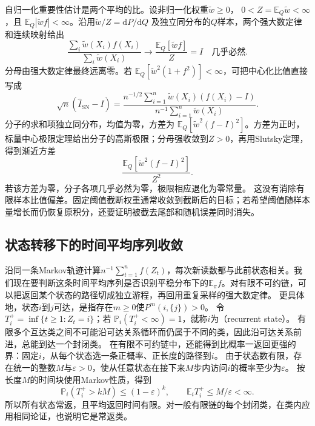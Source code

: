 自归一化重要性估计是两个平均的比。设非归一化权重\(\widetilde w\geq0\)，
\(0<Z=\mathbb E_Q\widetilde w<\infty\)，且
\(\mathbb E_Q|\widetilde wf|<\infty\)。沿用\(\widetilde w/Z=\mathrm dP/\mathrm dQ\)
及独立同分布的\(Q\)样本，两个强大数定律和连续映射给出
\[
\frac{\sum_i\widetilde w(X_i)f(X_i)}
{\sum_i\widetilde w(X_i)}
\longrightarrow
\frac{\mathbb E_Q[\widetilde wf]}Z=I
\quad\text{几乎必然}.
\]
分母由强大数定律最终远离零。若
\(\mathbb E_Q[\widetilde w^2(1+f^2)]<\infty\)，可把中心化比值直接写成
\[
 \sqrt n(\widehat I_{\mathrm{SN}}-I)
 =\frac{n^{-1/2}\sum_{i=1}^n
       \widetilde w(X_i)(f(X_i)-I)}
       {n^{-1}\sum_{i=1}^n\widetilde w(X_i)}.
\]
分子的求和项独立同分布，均值为零，方差为
\(\mathbb E_Q[\widetilde w^2(f-I)^2]\)。方差为正时，标量中心极限定理给出分子的高斯极限；分母强收敛到\(Z>0\)，再用Slutsky定理，得到渐近方差
\[
\frac{\mathbb E_Q[\widetilde w^2(f-I)^2]}{Z^2}.
\]
若该方差为零，分子各项几乎必然为零，极限相应退化为零常量。
这没有消除有限样本比值偏差。固定阈值截断权重通常收敛到截断后的目标；若希望阈值随样本量增长而仍恢复原积分，还要证明被截去尾部和随机误差同时消失。

\subsection{状态转移下的时间平均序列收敛}
\label{sec:stoch-markov-long-run-average}

沿同一条Markov轨迹计算\(n^{-1}\sum_{t=1}^n f(Z_t)\)，每次新读数都与此前状态相关。我们现在要判断这条时间平均序列是否识别平稳分布下的\(\mathbb E_\pi f\)。对有限不可约链，可以把返回某个状态的路径切成独立游程，再回用重复采样的强大数定律。
更具体地，状态\(i\)到\(j\)可达，是指存在\(m\geq0\)使\(P^m(i,\{j\})>0\)。
令\(T_i^+=\inf\{t\geq1:Z_t=i\}\)；若
$\mathbb{P}_i(T_i^+<\infty)=1$，就称$i$为（recurrent state）。
有限多个互达类之间不可能沿可达关系循环而仍属于不同的类，因此沿可达关系前进，总能到达一个封闭类。
在有限不可约链中，还能得到比概率一返回更强的界：固定$i$，从每个状态选一条正概率、正长度的路径到$i$。
由于状态数有限，存在统一的整数$M$与$\varepsilon>0$，使从任意状态在接下来$M$步内访问$i$的概率至少为$\varepsilon$。
按长度$M$的时间块使用Markov性质，得到
\[
 \mathbb P_i(T_i^+>kM)\leq(1-\varepsilon)^k,\qquad
 \mathbb E_iT_i^+\leq M/\varepsilon<\infty.
\]
所以所有状态常返，且平均返回时间有限。对一般有限链的每个封闭类，在类内应用相同论证，也说明它是常返类。

